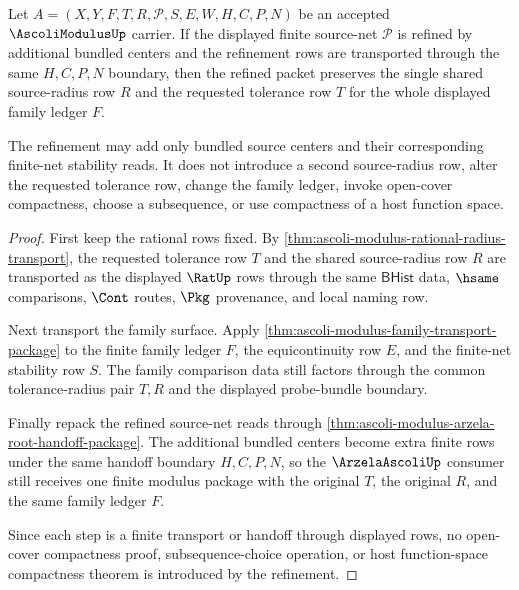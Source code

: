 \begin{theorem}
\label{thm:ascoli-modulus-shared-radius-refinement-boundary}
Let $A=(X,Y,F,T,R,\mathcal{P},S,E,W,H,C,P,N)$ be an accepted $\AscoliModulusUp$ carrier. If the displayed finite source-net $\mathcal{P}$ is refined by additional bundled centers and the refinement rows are transported through the same $H,C,P,N$ boundary, then the refined packet preserves the single shared source-radius row $R$ and the requested tolerance row $T$ for the whole displayed family ledger $F$.

The refinement may add only bundled source centers and their corresponding finite-net stability reads. It does not introduce a second source-radius row, alter the requested tolerance row, change the family ledger, invoke open-cover compactness, choose a subsequence, or use compactness of a host function space.
\end{theorem}
\begin{proof}
First keep the rational rows fixed. By \autoref{thm:ascoli-modulus-rational-radius-transport}, the requested tolerance row $T$ and the shared source-radius row $R$ are transported as the displayed $\RatUp$ rows through the same $\mathsf{BHist}$ data, $\hsame$ comparisons, $\Cont$ routes, $\Pkg$ provenance, and local naming row.

Next transport the family surface. Apply \autoref{thm:ascoli-modulus-family-transport-package} to the finite family ledger $F$, the equicontinuity row $E$, and the finite-net stability row $S$. The family comparison data still factors through the common tolerance-radius pair $T,R$ and the displayed probe-bundle boundary.

Finally repack the refined source-net reads through \autoref{thm:ascoli-modulus-arzela-root-handoff-package}. The additional bundled centers become extra finite rows under the same handoff boundary $H,C,P,N$, so the $\ArzelaAscoliUp$ consumer still receives one finite modulus package with the original $T$, the original $R$, and the same family ledger $F$.

Since each step is a finite transport or handoff through displayed rows, no open-cover compactness proof, subsequence-choice operation, or host function-space compactness theorem is introduced by the refinement.
\end{proof}

